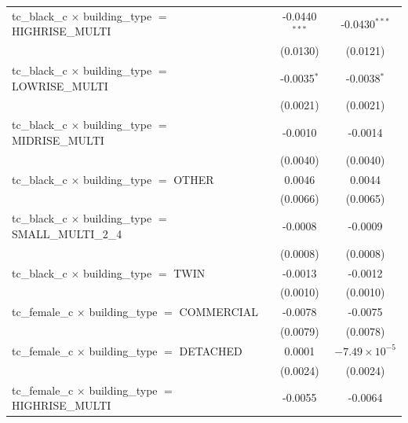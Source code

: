 \begin{tabular}{lcc}
   tc\_black\_c $\times$ building\_type $=$ HIGHRISE\_MULTI            & -0.0440$^{***}$        & -0.0430$^{***}$\\   
                                                                       & (0.0130)               & (0.0121)\\   
   tc\_black\_c $\times$ building\_type $=$ LOWRISE\_MULTI             & -0.0035$^{*}$          & -0.0038$^{*}$\\   
                                                                       & (0.0021)               & (0.0021)\\   
   tc\_black\_c $\times$ building\_type $=$ MIDRISE\_MULTI             & -0.0010                & -0.0014\\   
                                                                       & (0.0040)               & (0.0040)\\   
   tc\_black\_c $\times$ building\_type $=$ OTHER                      & 0.0046                 & 0.0044\\   
                                                                       & (0.0066)               & (0.0065)\\   
   tc\_black\_c $\times$ building\_type $=$ SMALL\_MULTI\_2\_4         & -0.0008                & -0.0009\\   
                                                                       & (0.0008)               & (0.0008)\\   
   tc\_black\_c $\times$ building\_type $=$ TWIN                       & -0.0013                & -0.0012\\   
                                                                       & (0.0010)               & (0.0010)\\   
   tc\_female\_c $\times$ building\_type $=$ COMMERCIAL                & -0.0078                & -0.0075\\   
                                                                       & (0.0079)               & (0.0078)\\   
   tc\_female\_c $\times$ building\_type $=$ DETACHED                  & 0.0001                 & $-7.49\times 10^{-5}$\\    
                                                                       & (0.0024)               & (0.0024)\\   
   tc\_female\_c $\times$ building\_type $=$ HIGHRISE\_MULTI           & -0.0055                & -0.0064\\   

\end{tabular}
